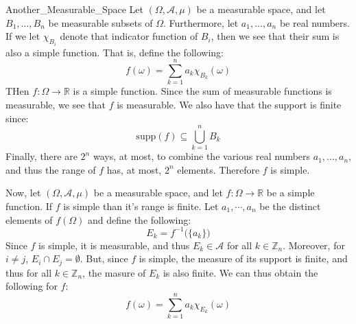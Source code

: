             \begin{lexample}{}{Another_Measurable_Space}
                Let $(\Omega,\mathcal{A},\mu)$ be a measurable
                space, and let $B_{1},\dots,B_{n}$ be measurable
                subsets of $\Omega$. Furthermore, let
                $a_{1},\dots,a_{n}$ be real numbers. If we let
                $\chi_{B_{i}}$ denote that indicator
                function of $B_{i}$, then we see that their sum
                is also a simple function. That is, define the
                following:
                \begin{equation}
                    f(\omega)=\sum_{k=1}^{n}
                        a_{k}\chi_{B_{k}}(\omega)
                \end{equation}
                THen $f:\Omega\rightarrow\mathbb{R}$ is a simple
                function. Since the sum of measurable functions
                is measurable, we see that $f$ is measurable.
                We also have that the support is finite since:
                \begin{equation}
                    \mathrm{supp}(f)\subseteq\bigcup_{k=1}^{n}B_{k}
                \end{equation}
                Finally, there are $2^{n}$ ways, at most, to
                combine the various real numbers
                $a_{1},\dots,a_{n}$, and thus the range of
                $f$ has, at most, $2^{n}$ elements. Therefore
                $f$ is simple.
            \end{lexample}
            Now, let $(\Omega,\mathcal{A},\mu)$ be a
            measurable space, and let
            $f:\Omega\rightarrow\mathbb{R}$ be a simple function.
            If $f$ is simple than it's range is finite. Let
            $a_{1},\cdots,a_{n}$ be the distinct elements of
            $f(\Omega)$ and define the following:
            \begin{equation}
                E_{k}=f^{-1}\big(\{a_{k}\}\big)
            \end{equation}
            Since $f$ is simple, it is measurable, and thus
            $E_{k}\in\mathcal{A}$ for all $k\in\mathbb{Z}_{n}$.
            Moreover, for $i\ne{j}$,
            $E_{i}\cap{E}_{j}=\emptyset$. But, since $f$ is
            simple, the measure of its support is finite, and
            thus for all $k\in\mathbb{Z}_{n}$,
            the masure of $E_{k}$ is also finite.
            We can thus obtain the following for $f$:
            \begin{equation}
                f(\omega)=
                    \sum_{k=1}^{n}a_{k}\chi_{E_{k}}(\omega)
            \end{equation}
